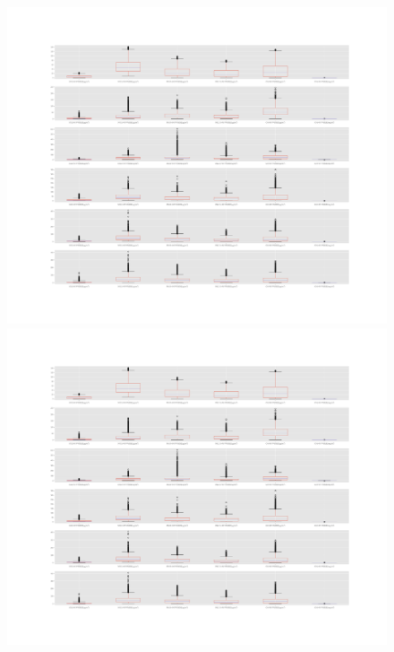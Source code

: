 \documentclass[a4paper,10pt]{my_paper}
\numberwithin{equation}{section}
\begin{document}
\begin{figure}[htb]
{  \includegraphics[width=1\textwidth]{box_plot_for_A2.pdf}\\
  \includegraphics[width=1\textwidth]{box_plot_for_A3.pdf}\\
}
\end{figure}
\end{document}
